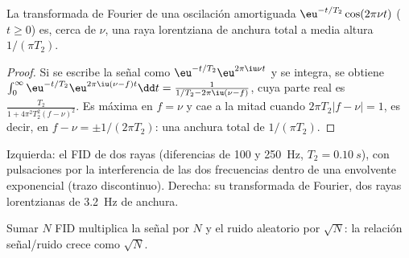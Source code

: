 \begin{theorem}\label{thm:b3:advanced-nmr:lorentzian}
La transformada de Fourier de una oscilación amortiguada $\eu^{-t/T_2}\cos(2\pi\nu t)$ ($t \ge 0$) es,
cerca de $\nu$, una raya lorentziana de anchura total a media altura $1/(\pi T_2)$.
\end{theorem}

\begin{proof}
Si se escribe la señal como $\eu^{-t/T_2}\eu^{2\pi\iu\nu t}$ y se integra, se obtiene
$\int_0^\infty\eu^{-t/T_2}\eu^{2\pi\iu(\nu - f)t}\dd t = \frac{1}{1/T_2 - 2\pi\iu(\nu - f)}$, cuya
parte real es $\frac{T_2}{1 + 4\pi^2T_2^2(f - \nu)^2}$. Es máxima en $f = \nu$ y cae a
la mitad cuando $2\pi T_2|f - \nu| = 1$, es decir, en $f - \nu = \pm1/(2\pi T_2)$: una anchura
total de $1/(\pi T_2)$.
\end{proof}

\begin{omfigure}

{\small Izquierda: el FID de dos rayas (diferencias de 100 y \qty{250}{Hz}, $T_2 = \qty{0.10}{s}$),
con pulsaciones por la interferencia de las dos frecuencias dentro de una envolvente exponencial
(trazo discontinuo). Derecha: su transformada de Fourier, dos rayas lorentzianas de \qty{3.2}{Hz} de anchura.}
\end{omfigure}

\begin{proposition}\label{prop:b3:advanced-nmr:averaging}
Sumar $N$ FID multiplica la señal por $N$ y el ruido aleatorio por $\sqrt N$:
la relación señal/ruido crece como $\sqrt N$.
\end{proposition}

